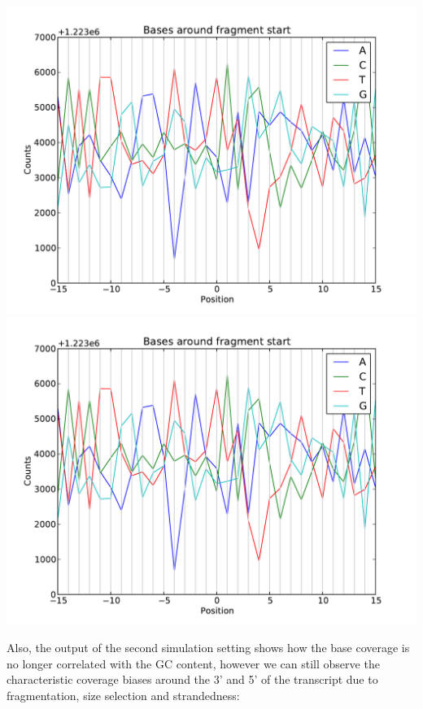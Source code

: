\begin{center}
\includegraphics[scale=0.6,page=1]{../src/test/pos_bias/pb_after_noprim_double.pdf}
\\
\includegraphics[scale=0.6,page=2]{../src/test/pos_bias/pb_after_noprim_double.pdf}
\end{center}

Also, the output of the second simulation setting shows how the base coverage is no longer correlated with the GC content, however we can still observe the
characteristic coverage biases around the 3' and 5' of the transcript due to fragmentation, size selection and strandedness:

